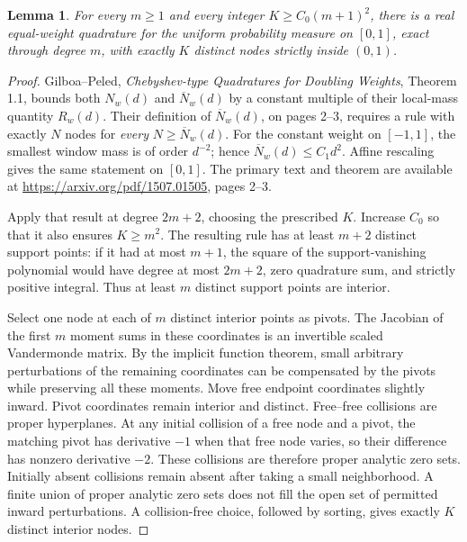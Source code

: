 \documentclass[11pt]{article}
\newtheorem{lemma}{Lemma}
\begin{document}
\begin{lemma}
For every $m\ge1$ and every integer $K\ge C_0(m+1)^2$, there is a
real equal-weight quadrature for the uniform probability measure on
$[0,1]$, exact through degree $m$, with exactly $K$ distinct nodes
strictly inside $(0,1)$.
\end{lemma}
\begin{proof}
Gilboa--Peled, \emph{Chebyshev-type Quadratures for Doubling Weights},
Theorem 1.1, bounds both $N_w(d)$ and $\overline N_w(d)$ by a constant
multiple of their local-mass quantity $R_w(d)$.
Their definition of $\overline N_w(d)$, on pages 2--3, requires a rule
with exactly $N$ nodes for \emph{every} $N\ge\overline N_w(d)$.
For the constant weight on $[-1,1]$, the smallest window mass is of
order $d^{-2}$; hence $\overline N_w(d)\le C_1d^2$.
Affine rescaling gives the same statement on $[0,1]$.
The primary text and theorem are available at
\url{https://arxiv.org/pdf/1507.01505}, pages 2--3.

Apply that result at degree $2m+2$, choosing the prescribed $K$.
Increase $C_0$ so that it also ensures $K\ge m^2$.
The resulting rule has at least $m+2$ distinct support points: if it
had at most $m+1$, the square of the support-vanishing polynomial
would have degree at most $2m+2$, zero quadrature sum, and strictly
positive integral. Thus at least $m$ distinct support points are
interior.

Select one node at each of $m$ distinct interior points as pivots.
The Jacobian of the first $m$ moment sums in these coordinates is
an invertible scaled Vandermonde matrix. By the implicit function
theorem, small arbitrary perturbations of the remaining coordinates
can be compensated by the pivots while preserving all these moments.
Move free endpoint coordinates slightly inward. Pivot coordinates
remain interior and distinct. Free--free collisions are proper
hyperplanes. At any initial collision of a free node and a pivot,
the matching pivot has derivative $-1$ when that free node varies,
so their difference has nonzero derivative $-2$. These collisions
are therefore proper analytic zero sets. Initially absent collisions
remain absent after taking a small neighborhood.
A finite union of proper analytic zero sets does not fill the open
set of permitted inward perturbations. A collision-free choice,
followed by sorting, gives exactly $K$ distinct interior nodes.
\end{proof}
\end{document}
